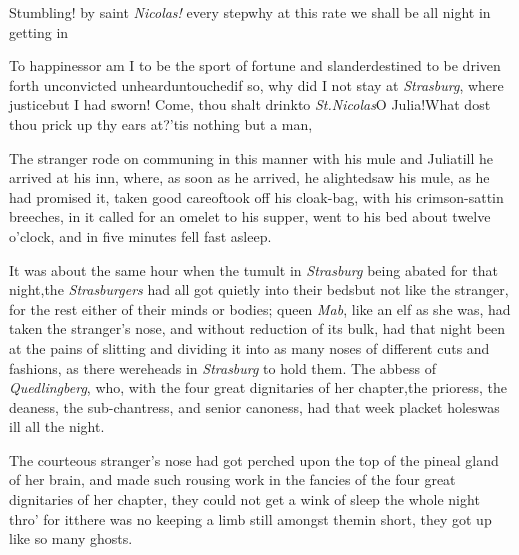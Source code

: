 \documentclass{article}
\begin{document}
\tsk Stumbling! by saint \textit{Nicolas!} every step\tsk why at this rate we shall be
all night in getting in\tsh

\tsk To happiness\tsk or am I to be the sport of fortune and
slander\tsk destined to be driven forth unconvicted\tsk
unheard\tsk untouched\tsk if so, why did I not stay at
\textit{Strasburg}, where justice\tsk but I had sworn!\tsk
Come, thou shalt drink\tsk to \textit{St.\@ Nicolas}\tsk O
Julia!\tsh What dost thou prick up thy ears at?\tsh ’tis
nothing but a man, \etc\tsh

The stranger rode on communing in this manner with his mule
and Julia\tsk\break till he arrived at his inn, where, as soon as
he arrived, he alighted\tsk saw his mule, as he had promised
it, taken good care\break of\tsh took off his cloak-bag, with his
crimson-sattin breeches, \etc in it\tsk{}
called for an omelet
to his supper, went to his bed about twelve o’clock, and in
five minutes fell fast asleep.

It was about the same hour when the tumult in \textit{Strasburg}
being abated for that night,\tsh the \textit{Strasburgers} had all
got quietly into their beds\tsk but not like the stranger, for
the rest either of their minds or bodies; queen \textit{Mab}, like an
elf as she was, had taken the stranger’s nose, and without
reduction of its bulk, had that night been at the pains of slitting
and dividing it into as many noses of different cuts and fashions,
as there were\break heads in \textit{Strasburg} to hold them. The abbess of
\textit{Quedlingberg}, who, with the four great dignitaries of her
chapter,\break the prioress, the deaness, the sub-chan\-tress, and senior
canoness, had that week 
placket holes\tsk was ill all the night.

\parskip

The courteous stranger’s nose had got perched upon the top
of the pineal gland of her brain, and made such rousing\break 
work in the fancies of the four great\break
dignitaries of her chapter, they could not get a wink of
sleep the whole night thro’ for it\tsh there was no
keeping a limb still amongst them\tsh in short, they got
up like so many ghosts.

\parskip
\end{document}
